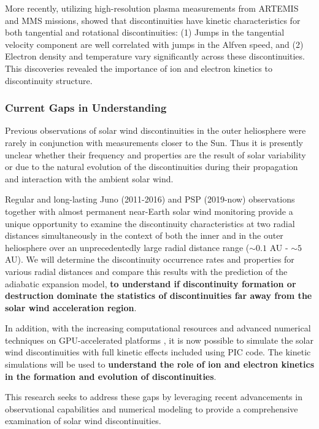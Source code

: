 \documentclass[
  letterpaper,
  DIV=11,
  numbers=noendperiod]{scrartcl}
\begin{document}
More recently, utilizing high-resolution plasma measurements from ARTEMIS and MMS missions, \citet{artemyevKineticNatureSolar2019} showed that discontinuities have kinetic characteristics for both tangential and rotational discontinuities: (1) Jumps in the tangential velocity component are well correlated with jumps in the Alfven speed, and (2) Electron density and temperature vary significantly across these discontinuities. This discoveries revealed the importance of ion and electron kinetics to discontinuity structure.

\subsubsection{Current Gaps in Understanding}\label{current-gaps-in-understanding}

Previous observations of solar wind discontinuities in the outer heliosphere were rarely in conjunction with measurements closer to the Sun. Thus it is presently unclear whether their frequency and properties are the result of solar variability or due to the natural evolution of the discontinuities during their propagation and interaction with the ambient solar wind.

Regular and long-lasting Juno (2011-2016) and PSP (2019-now) observations together with almost permanent near-Earth solar wind monitoring provide a unique opportunity to examine the discontinuity characteristics at two radial distances simultaneously in the context of both the inner and in the outer heliosphere over an unprecedentedly large radial distance range (\(\sim 0.1\) AU - \(\sim 5\) AU). We will determine the discontinuity occurrence rates and properties for various radial distances and compare this results with the prediction of the adiabatic expansion model, \textbf{to understand if discontinuity formation or destruction dominate the statistics of discontinuities far away from the solar wind acceleration region}.

In addition, with the increasing computational resources and advanced numerical techniques on GPU-accelerated platforms \citep{myersPortingWarpXGPUaccelerated2021}, it is now possible to simulate the solar wind discontinuities with full kinetic effects included using PIC code. The kinetic simulations will be used to \textbf{understand the role of ion and electron kinetics in the formation and evolution of discontinuities}.

This research seeks to address these gaps by leveraging recent advancements in observational capabilities and numerical modeling to provide a comprehensive examination of solar wind discontinuities.
\end{document}
